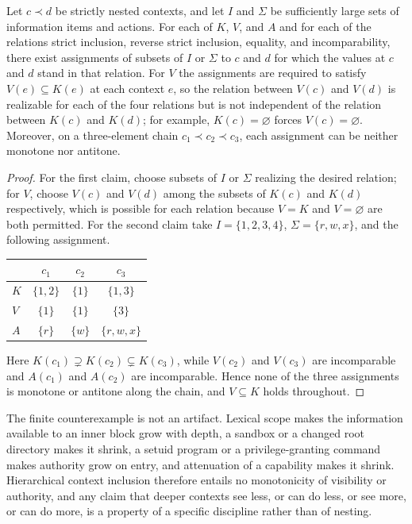 \begin{proposition}\label{prop:nomonotone}
Let $c\prec d$ be strictly nested contexts, and let $I$ and $\Sigma$ be sufficiently large sets of information items and actions. For each of $K$, $V$, and $A$ and for each of the relations strict inclusion, reverse strict inclusion, equality, and incomparability, there exist assignments of subsets of $I$ or $\Sigma$ to $c$ and $d$ for which the values at $c$ and $d$ stand in that relation. For $V$ the assignments are required to satisfy $V(e)\subseteq K(e)$ at each context $e$, so the relation between $V(c)$ and $V(d)$ is realizable for each of the four relations but is not independent of the relation between $K(c)$ and $K(d)$; for example, $K(c)=\varnothing$ forces $V(c)=\varnothing$. Moreover, on a three-element chain $c_1\prec c_2\prec c_3$, each assignment can be neither monotone nor antitone.
\end{proposition}
\begin{proof}
For the first claim, choose subsets of $I$ or $\Sigma$ realizing the desired relation; for $V$, choose $V(c)$ and $V(d)$ among the subsets of $K(c)$ and $K(d)$ respectively, which is possible for each relation because $V=K$ and $V=\varnothing$ are both permitted. For the second claim take $I=\{1,2,3,4\}$, $\Sigma=\{r,w,x\}$, and the following assignment.
\begin{center}
\begin{tabular}{lccc}
\toprule
 & $c_1$ & $c_2$ & $c_3$\\
\midrule
$K$ & $\{1,2\}$ & $\{1\}$ & $\{1,3\}$\\
$V$ & $\{1\}$ & $\{1\}$ & $\{3\}$\\
$A$ & $\{r\}$ & $\{w\}$ & $\{r,w,x\}$\\
\bottomrule
\end{tabular}
\end{center}
Here $K(c_1)\supsetneq K(c_2)\subsetneq K(c_3)$, while $V(c_2)$ and $V(c_3)$ are incomparable and $A(c_1)$ and $A(c_2)$ are incomparable. Hence none of the three assignments is monotone or antitone along the chain, and $V\subseteq K$ holds throughout.
\end{proof}

The finite counterexample is not an artifact. Lexical scope makes the information available to an inner block grow with depth, a sandbox or a changed root directory makes it shrink, a setuid program or a privilege-granting command makes authority grow on entry, and attenuation of a capability makes it shrink. Hierarchical context inclusion therefore entails no monotonicity of visibility or authority, and any claim that deeper contexts see less, or can do less, or see more, or can do more, is a property of a specific discipline rather than of nesting.


